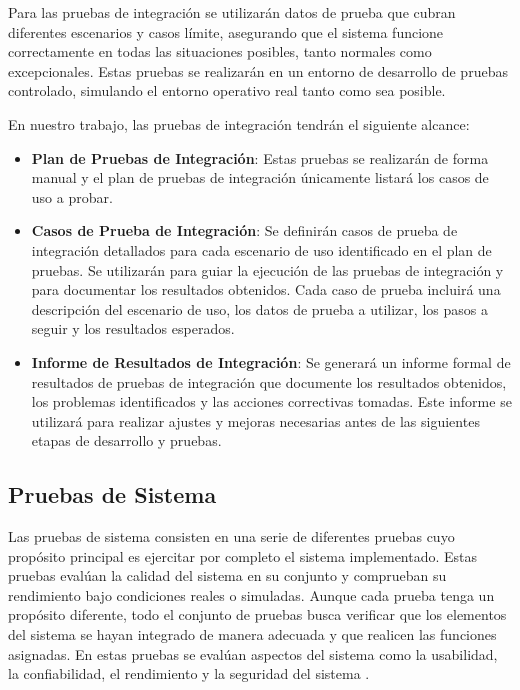 \documentclass[main.tex]{subfiles}
\begin{document}
Para las pruebas de integración se utilizarán datos de prueba que cubran diferentes escenarios y casos límite, asegurando que el sistema funcione correctamente en todas las situaciones posibles, tanto normales como excepcionales. Estas pruebas se realizarán en un entorno de desarrollo de pruebas controlado, simulando el entorno operativo real tanto como sea posible.

En nuestro trabajo, las pruebas de integración tendrán el siguiente alcance:

\begin{itemize}
	\item \textbf{Plan de Pruebas de Integración}: Estas pruebas se realizarán de forma manual y el plan de pruebas de integración únicamente listará los casos de uso a probar.
	\item \textbf{Casos de Prueba de Integración}: Se definirán casos de prueba de integración detallados para cada escenario de uso identificado en el plan de pruebas. Se utilizarán para guiar la ejecución de las pruebas de integración y para documentar los resultados obtenidos. Cada caso de prueba incluirá una descripción del escenario de uso, los datos de prueba a utilizar, los pasos a seguir y los resultados esperados.
	\item \textbf{Informe de Resultados de Integración}: Se generará un informe formal de resultados de pruebas de integración que documente los resultados obtenidos, los problemas identificados y las acciones correctivas tomadas. Este informe se utilizará para realizar ajustes y mejoras necesarias antes de las siguientes etapas de desarrollo y pruebas.
\end{itemize}

\subsection{Pruebas de Sistema}

Las pruebas de sistema consisten en una serie de diferentes pruebas cuyo propósito principal es ejercitar por completo el sistema implementado. Estas pruebas evalúan la calidad del sistema en su conjunto y comprueban su rendimiento bajo condiciones reales o simuladas. Aunque cada prueba tenga un propósito diferente, todo el conjunto de pruebas busca verificar que los elementos del sistema se hayan integrado de manera adecuada y que realicen las funciones asignadas. En estas pruebas se evalúan aspectos del sistema como la usabilidad, la confiabilidad, el rendimiento y la seguridad del sistema \cite{pressman2010ingeneria}.
\end{document}
